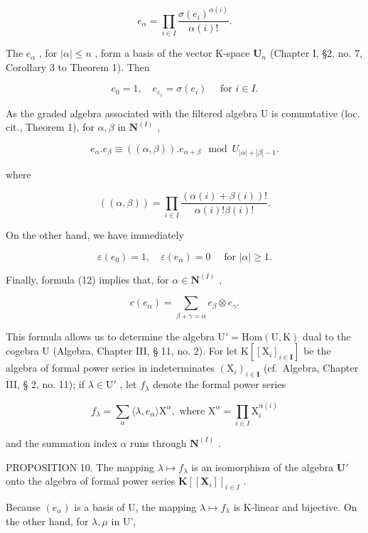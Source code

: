 \[
e _ {\alpha} = \prod_ {i \in I} \frac {\sigma (e _ {i}) ^ {\alpha (i)}}{\alpha (i) !}.\tag{13}
\]

The \(e_{\alpha}\) , for \(|\alpha| \leqslant n\) , form a basis of the vector K-space \(\mathbf{U}_n\) (Chapter I, §2, no. 7, Corollary 3 to Theorem 1). Then

\[
e _ {0} = 1, \quad e _ {\varepsilon_ {i}} = \sigma (e _ {i}) \quad \text { for } i \in I.
\]

As the graded algebra associated with the filtered algebra U is commutative (loc. cit., Theorem 1), for \(\alpha, \beta\) in \(\mathbf{N}^{(I)}\) ,

\[
e _ {\alpha}. e _ {\beta} \equiv ((\alpha , \beta)). e _ {\alpha + \beta} \mod U _ {| \alpha | + | \beta | - 1}.\tag{14}
\]

where

\[
((\alpha , \beta)) = \prod_ {i \in I} \frac {(\alpha (i) + \beta (i)) !}{\alpha (i) ! \beta (i) !}.
\]

On the other hand, we have immediately

\[
\varepsilon (e _ {0}) = 1, \quad \varepsilon (e _ {\alpha}) = 0 \quad \text { for } | \alpha | \geqslant 1.\tag{15}
\]

Finally, formula (12) implies that, for \(\alpha \in \mathbf{N}^{(I)}\) ,

\[
c (e _ {\alpha}) = \sum_ {\beta + \gamma = \alpha} e _ {\beta} \otimes e _ {\gamma}.\tag{16}
\]

This formula allows us to determine the algebra \(\mathrm{U}' = \mathrm{Hom}(\mathrm{U},\mathrm{K})\) dual to the cogebra U (Algebra, Chapter III, § 11, no. 2). For let \(\mathrm{K}[[\mathrm{X}_i]_{i\in \mathbf{I}}]\) be the algebra of formal power series in indeterminates \((\mathrm{X}_i)_{i\in \mathbf{I}}\) (cf.~Algebra, Chapter III, § 2, no. 11); if \(\lambda \in \mathrm{U}'\) , let \(f_{\lambda}\) denote the formal power series

\[
f _ {\lambda} = \sum_ {\alpha} \langle \lambda , e _ {\alpha} \rangle \mathrm{X} ^ {\alpha}, \text { where } \mathrm{X} ^ {\alpha} = \prod_ {i \in I} \mathrm{X} _ {i} ^ {\alpha (i)}
\]

and the summation index \(\alpha\) runs through \(\mathbf{N}^{(I)}\) .

PROPOSITION 10. The mapping \(\lambda \mapsto f_{\lambda}\) is an isomorphism of the algebra \(\mathbf{U}'\) onto the algebra of formal power series \(\mathbf{K}[[\mathbf{X}_i]]_{i \in I}\) .

Because \((e_{\alpha})\) is a basis of U, the mapping \(\lambda \mapsto f_{\lambda}\) is K-linear and bijective. On the other hand, for \(\lambda, \mu\) in U',

